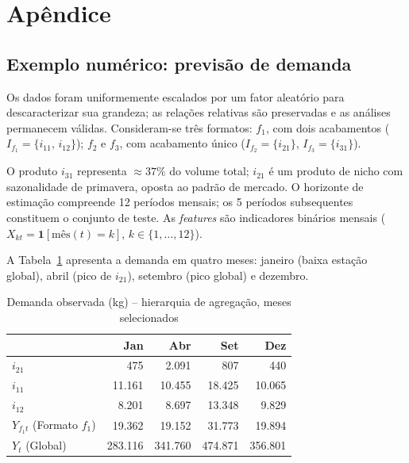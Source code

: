 \documentclass[fleqn,12pt,a4paper]{article}
\begin{document}
\newpage


   

\newpage

\section*{Apêndice}

\subsection*{Exemplo numérico: previsão de demanda}

Os dados foram uniformemente escalados por um fator aleatório para descaracterizar sua
grandeza; as relações relativas são preservadas e as análises permanecem válidas.
Consideram-se três formatos: $f_1$, com dois acabamentos ($I_{f_1} = \{i_{11},\, i_{12}\}$);
$f_2$ e $f_3$, com acabamento único ($I_{f_2} = \{i_{21}\}$, $I_{f_3} = \{i_{31}\}$).

O produto $i_{31}$ representa ${\approx}37\%$ do volume total; $i_{21}$ é um produto de
nicho com sazonalidade de primavera, oposta ao padrão de mercado.
O horizonte de estimação compreende 12 períodos mensais; os 5 períodos subsequentes
constituem o conjunto de teste.
As \textit{features} são indicadores binários mensais
($X_{kt} = \mathbf{1}[\text{mês}(t) = k]$, $k \in \{1,\ldots,12\}$).

A Tabela~\ref{tab:dados} apresenta a demanda em quatro meses: janeiro (baixa estação
global), abril (pico de $i_{21}$), setembro (pico global) e dezembro.

\begin{table}[ht]
\centering
\small
\caption{Demanda observada (kg) -- hierarquia de agregação, meses selecionados}
\label{tab:dados}
\begin{tabular}{lrrrr}
\toprule
 & \textbf{Jan} & \textbf{Abr} & \textbf{Set} & \textbf{Dez} \\
\midrule
$i_{21}$                &       475 &     2.091 &       807 &       440 \\
$i_{11}$                &    11.161 &    10.455 &    18.425 &    10.065 \\
$i_{12}$                &     8.201 &     8.697 &    13.348 &     9.829 \\
\midrule
$Y_{f_1 t}$ (Formato $f_1$) & 19.362 & 19.152 &  31.773 &    19.894 \\
$Y_t$ (Global)           &   283.116 &   341.760 &   474.871 &   356.801 \\
\bottomrule
\end{tabular}
\end{table}
\end{document}
